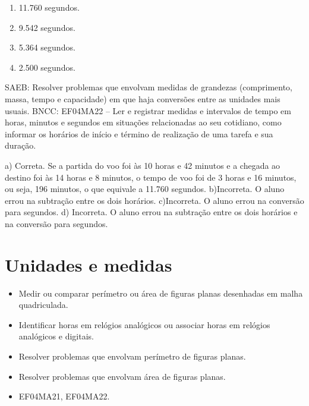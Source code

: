 \begin{mdframed}[linewidth=2pt,linecolor=salmao,roundcorner=2pt]
\begin{itemize}
{\begin{itemize}
\begin{escolha}
\begin{enumerate}
\item
  11.760 segundos.
\item
  9.542 segundos.
\item
  5.364 segundos.
\item
  2.500 segundos.
\end{enumerate}

SAEB: Resolver problemas que envolvam medidas de grandezas (comprimento, massa, tempo e capacidade) em que haja conversões entre as unidades mais usuais.
BNCC: EF04MA22 -- Ler e registrar medidas e intervalos de tempo em horas, minutos e segundos em
situações relacionadas ao seu cotidiano, como informar os horários de início e término de realização
de uma tarefa e sua duração.

a) Correta. Se a partida do voo foi às 10 horas e 42 minutos e a chegada ao destino foi às 14 horas e 8 minutos, o tempo de voo foi de 3 horas e 16 minutos, ou seja, 196 minutos, o que equivale a 11.760 segundos.
b)Incorreta. O aluno errou na subtração entre os dois horários.
c)Incorreta. O aluno errou na conversão para segundos.
d) Incorreta. O aluno errou na subtração entre os dois horários e na conversão para segundos.


\chapter{Unidades e medidas}


\begin{itemize}
\item Medir ou comparar perímetro ou área de figuras planas desenhadas em
malha quadriculada.
\item Identificar horas em relógios analógicos ou associar horas em relógios
analógicos e digitais.
\item Resolver problemas que envolvam perímetro de figuras planas.
\item Resolver problemas que envolvam área de figuras planas.
\end{itemize}


\begin{itemize}
\item EF04MA21, EF04MA22.
\end{itemize}

\end{escolha}
\end{itemize}}
\end{itemize}
\end{mdframed}

